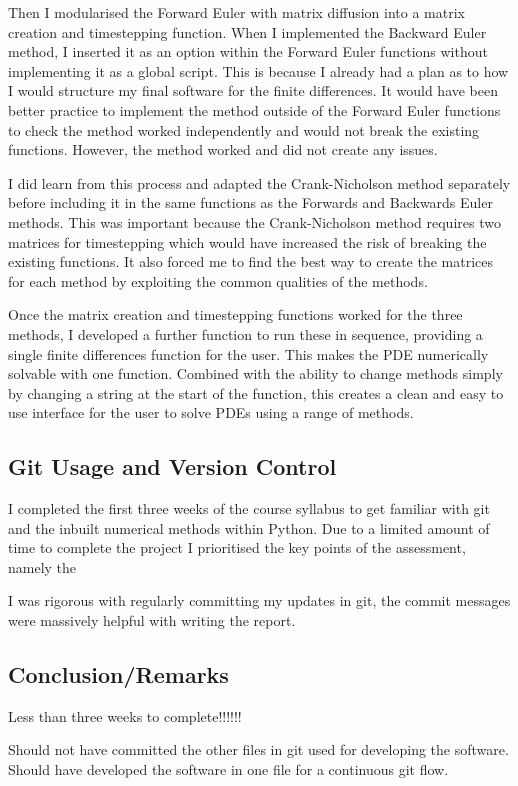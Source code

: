 \documentclass[10pt]{article}
\begin{document}
\begin{multicols}{2}
Then I modularised the Forward Euler with matrix diffusion into a matrix creation and timestepping function. When I implemented the Backward Euler method, I inserted it as an option within the Forward Euler functions without implementing it as a global script. This is because I already had a plan as to how I would structure my final software for the finite differences. It would have been better practice to implement the method outside of the Forward Euler functions to check the method worked independently and would not break the existing functions. However, the method worked and did not create any issues.

I did learn from this process and adapted the Crank-Nicholson method separately before including it in the same functions as the Forwards and Backwards Euler methods. This was important because the Crank-Nicholson method requires two matrices for timestepping which would have increased the risk of breaking the existing functions. It also forced me to find the best way to create the matrices for each method by exploiting the common qualities of the methods.

Once the matrix creation and timestepping functions worked for the three methods, I developed a further function to run these in sequence, providing a single finite differences function for the user. This makes the PDE numerically solvable with one function. Combined with the ability to change methods simply by changing a string at the start of the function, this creates a clean and easy to use interface for the user to solve PDEs using a range of methods.



\subsection{Git Usage and Version Control}

I completed the first three weeks of the course syllabus to get familiar with git and the inbuilt numerical methods within Python. Due to a limited amount of time to complete the project I prioritised the key points of the assessment, namely the  

I was rigorous with regularly committing my updates in git, the commit messages were massively helpful with writing the report.  


\subsection{Conclusion/Remarks}

Less than three weeks to complete!!!!!!

Should not have committed the other files in git used for developing the software.
Should have developed the software in one file for a continuous git flow.


\end{multicols}


\printbibliography 
\end{document}
